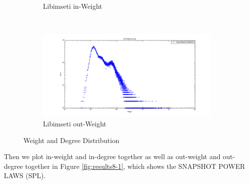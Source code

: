 \begin{figure}
\begin{subfigure}[htbp]{0.6\textwidth}
                \caption{Libimseti in-Weight}
                \label{fig:dw_inw}
        \end{subfigure} %
        ~ %
        \begin{subfigure}[htbp]{0.6\textwidth}
                \includegraphics[width=\textwidth]{FIG/dw_outw.png}
                \caption{Libimseti out-Weight}
                \label{fig:dw_outw}
        \end{subfigure}
        \caption{Weight and Degree Distribution}
        \label{fig:results8}
\end{figure}
Then we plot in-weight and in-degree together as well as out-weight and out-degree together in Figure \ref{fig:results8-1}, which shows the SNAPSHOT POWER LAWS (SPL). \\

